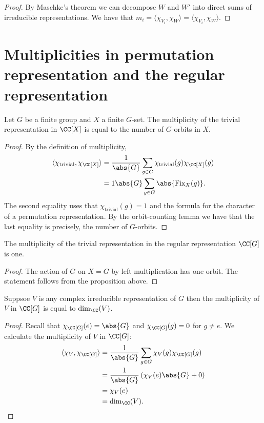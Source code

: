 \documentclass[12pt, a4paper]{article}
\begin{document}
\begin{proof}
    By Maschke's theorem we can decompose \(W\) and \(W'\) into direct sums of irreducible representations. We have that \(m_i = \langle \chi_{V_i},\chi_W \rangle = \langle \chi_{V_i}, \chi_{W} \rangle\). 
\end{proof}

\section{Multiplicities in permutation representation and the regular representation}

\begin{proposition}
    Let \(G\) be a finite group and \(X\) a finite \(G\)-set. The multiplicity of the trivial representation in \(\CC[X]\) is equal to the number of \(G\)-orbits in \(X\).
\end{proposition}

\begin{proof}
    By the definition of multiplicity,
    \[\begin{aligned}
        \langle \chi_\text{trivial}, \chi_{\CC[X]} \rangle &= \frac{1}{\abs{G}} \sum_{g\in G} \chi_{\text{trivial}}(g) \chi_{\CC[X]}(g) \\
        &= {1}{\abs{G}} \sum_{g\in G} \abs{\text{Fix}_X(g)}.
    \end{aligned}\]
    The second equality uses that \(\chi_\text{trivial}(g)=1\) and the formula for the character of a permutation representation. By the orbit-counting lemma we have that the last equality is precisely, the number of \(G\)-orbits.
\end{proof}

\begin{mdcor}
    The multiplicity of the trivial representation in the regular representation \(\CC[G]\) is one.
\end{mdcor}

\begin{proof}
    The action of \(G\) on \(X =G\) by left multiplication has one orbit. The statement follows from the proposition above.
\end{proof}

\begin{mdprop}
    Suppsoe \(V\) is any complex irreducible representation of \(G\) then the multiplicity of \(V\) in \(\CC[G]\) is equal to \(\dim_{\CC}(V)\).
\end{mdprop}

\begin{proof}
    Recall that \(\chi_{\CC[G]}(e)=\abs{G}\) and \(\chi_{\CC[G]}(g)=0\) for \(g\neq e\). We calculate the multiplicity of \(V\) in \(\CC[G]\):
    \[\begin{aligned}
        \langle \chi_V, \chi_{\CC[G]} \rangle &= \frac{1}{\abs{G}}\sum_{g\in G} \chi_V(g)\chi_{\CC[G]}(g) \\
        &= \frac{1}{\abs{G}}\left( \chi_V(e) \abs{G} +0\right) \\
        &= \chi_V(e) \\
        &=\dim_{\CC}(V).
    \end{aligned}\]
\end{proof}
\end{document}
